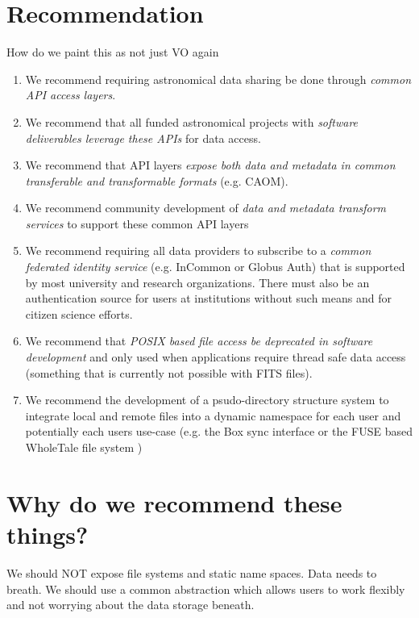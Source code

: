 \section{Recommendation }

How do we paint this as not just VO again

\begin{enumerate}
\item We recommend requiring astronomical data sharing be done through \emph{common API
access layers}.

\item We recommend that all funded astronomical projects with \emph{software deliverables
leverage these APIs} for data access. 

\item We recommend that API layers \emph{expose both data and metadata in common 
transferable and transformable formats} (e.g. CAOM).

\item We recommend community development of \emph{data and metadata transform services}
to support these common API layers 

\item We recommend requiring all data providers to subscribe to a 
\emph{common federated identity service} (e.g. InCommon or 
Globus Auth) that is supported by most university and research organizations. There 
must also be 
an authentication source for users at institutions without such means and for 
citizen science efforts.

\item We recommend that \emph{POSIX based file access be deprecated
in software development} and only used when applications require thread safe
data access (something that is currently not possible with FITS files).

\item We recommend the development of a psudo-directory structure system to
integrate local and remote files into a dynamic namespace for each user and potentially
each users use-case (e.g. the Box sync interface or the FUSE based WholeTale file system
\citep{BRINCKMAN2019854}) 


\end{enumerate}

\section{Why do we recommend these things?}


We should NOT expose file systems and static name spaces.  Data needs to breath. We should use a common abstraction which allows users to work flexibly and not worrying about the data storage beneath.

